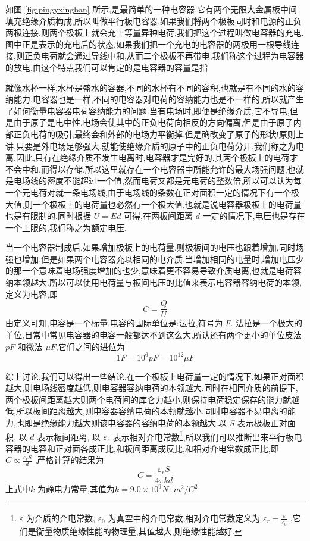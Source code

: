 如图 \ref{fig:pingyxingban} 所示,是最简单的一种电容器,它有两个无限大金属板中间填充绝缘介质构成,所以叫做平行板电容器.如果我们将两个极板同时和电源的正负两极连接,则两个极板上就会充上等量异种电荷,我们把这个过程叫做电容器的充电.图中正是表示的充电后的状态.如果我们把一个充电的电容器的两极用一根导线连接,则正负电荷就会通过导线中和,从而二个极板不再带电,我们称这个过程为电容器的放电.由这个特点我们可以肯定的是电容器的容量是指

就像水杯一样,水杯是盛水的容器,不同的水杯有不同的容积,也就是有不同的水的容纳能力.电容器也是一样,不同的电容器对电荷的容纳能力也是不一样的,所以就产生了如何衡量电容器电荷容纳能力的问题.当有电场时,即便是绝缘介质,它不导电,但是由于原子是电中性,电场会使其中的正负电荷向相反的方向偏离,但是由于原子内部正负电荷的吸引,最终会和外部的电场力平衡掉.但是确改变了原子的形状!原则上讲,只要是外电场足够强大,就能使绝缘介质的原子中的正负电荷分开,我们称之为电离.因此,只有在绝缘介质不发生电离时,电容器才是完好的,其两个极板上的电荷才不会中和,而得以存储.所以这里就存在一个电容器中所能允许的最大场强问题,也就是电场线的密度不能超过一个值,然而电荷又都是元电荷的整数倍,所以可以认为每一个元电荷对就一条电场线,由于电场线的条数在正对面积一定的情况下有一个极大值,则一个极板上的电荷量也必然有一个极大值,也就是说电容器极板上的电荷量也是有限制的.同时根据 
$U=Ed$ 可得,在两板间距离 $d$ 一定的情况下,电压也是存在一个上限的,我们称之为额定电压.

当一个电容器制成后,如果增加极板上的电荷量,则极板间的电压也跟着增加,同时场强也增加,但是如果两个电容器充以相同的电介质,当增加相同的电量时,增加电压少的那一个意味着电场强度增加的也少,意味着更不容易导致介质电离,也就是电荷容纳本领越大.所以可以使用电荷量与板间电压的比值来表示电容器容纳电荷的本领,定义为电容,即
\begin{equation}
  C=\frac{Q}{U}
  \label{eq:dianrong}
\end{equation}
由定义可知,电容是一个标量.电容的国际单位是:法拉,符号为:$F$. 法拉是一个极大的单位,日常中常见电容器的电容一般都达不到这么大,所认还有两个更小的单位皮法$pF$ 和微法 $\mu F$,它们之间的进位为
\begin{equation}
  1F=10^6 pF = 10^{12} \mu F
  \label{eq:falajinwei}
\end{equation}

综上讨论,我们可以得出一些结论,在一个极板上电荷量一定的情况下,如果正对面积越大,则电场线密度越低,则电容器容纳电荷的本领越大.同时在相同介质的前提下,两个极板间距离越大则两个电荷间的库仑力越小,则保持电荷稳定保存的能力就越低,所以板间距离越大,则电容器容纳电荷的本领就越小.同时电容器不易电离的能力,也即是绝缘能力越大则该电容器的容纳电荷的本领越大.以 $S$ 表示极板正对面积, 以 $d$ 表示板间距离, 以 $\varepsilon_r$ 表示相对介电常数\footnote{$\varepsilon$ 为介质的介电常数, $\varepsilon_0$ 为真空中的介电常数,相对介电常数定义为 $\varepsilon_r=\frac{\varepsilon}{\varepsilon_0}$ ,它们是衡量物质绝缘性能的物理量,其值越大,则绝缘性能越好.},所以我们可以推断出来平行板电容器的电容和正对面各成正比,和板间距离成反比,和相对介电常数成正比,即 $C\propto \frac{\varepsilon_r S}{d}$ ,严格计算的结果为
\begin{equation}
  C=\frac{\varepsilon_r S}{4\pi k d}
  \label{eq:dianrongpingban}
\end{equation}
上式中$k$ 为静电力常量,其值为$k=9.0\times 10^9 N\cdot m^2/C^2$.

